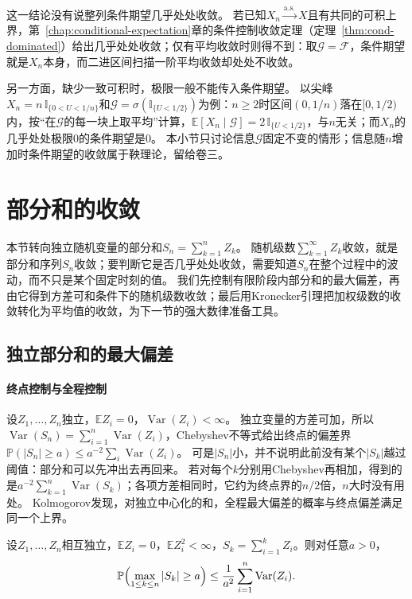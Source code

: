 这一结论没有说整列条件期望几乎处处收敛。
若已知$X_n\xrightarrow{\mathrm{a.s.}}X$且有共同的可积上界，第~\ref{chap:conditional-expectation}章的条件控制收敛定理（定理~\ref{thm:cond-dominated}）给出几乎处处收敛；仅有平均收敛时则得不到：取$\mathcal G=\mathcal F$，条件期望就是$X_n$本身，而二进区间扫描一阶平均收敛却处处不收敛。

另一方面，缺少一致可积时，极限一般不能传入条件期望。
以尖峰$X_n=n\,\mathbb I_{\{0<U<1/n\}}$和$\mathcal G=\sigma(\mathbb I_{\{U<1/2\}})$为例：$n\geq2$时区间$(0,1/n)$落在$[0,1/2)$内，按“在$\mathcal G$的每一块上取平均”计算，$\mathbb E[X_n\mid\mathcal G]=2\,\mathbb I_{\{U<1/2\}}$，与$n$无关；而$X_n$的几乎处处极限$0$的条件期望是$0$。
本小节只讨论信息$\mathcal G$固定不变的情形；信息随$n$增加时条件期望的收敛属于鞅理论，留给卷三。

\section{部分和的收敛}
\label{sec:conv-partial-sums}

本节转向独立随机变量的部分和$S_n=\sum_{k=1}^nZ_k$。
随机级数$\sum_{k=1}^{\infty}Z_k$收敛，就是部分和序列$S_n$收敛；要判断它是否几乎处处收敛，需要知道$S_n$在整个过程中的波动，而不只是某个固定时刻的值。
我们先控制有限阶段内部分和的最大偏差，再由它得到方差可和条件下的随机级数收敛；最后用Kronecker引理把加权级数的收敛转化为平均值的收敛，为下一节的强大数律准备工具。

\subsection{独立部分和的最大偏差}

\paragraph{终点控制与全程控制}
设$Z_1,\ldots,Z_n$独立，$\mathbb EZ_i=0$，$\operatorname{Var}(Z_i)<\infty$。
独立变量的方差可加，所以$\operatorname{Var}(S_n)=\sum_{i=1}^n\operatorname{Var}(Z_i)$，Chebyshev不等式给出终点的偏差界$\mathbb P(|S_n|\geq a)\leq a^{-2}\sum_i\operatorname{Var}(Z_i)$。
可是$|S_n|$小，并不说明此前没有某个$|S_k|$越过阈值：部分和可以先冲出去再回来。
若对每个$k$分别用Chebyshev再相加，得到的是$a^{-2}\sum_{k=1}^n\operatorname{Var}(S_k)$；各项方差相同时，它约为终点界的$n/2$倍，$n$大时没有用处。
Kolmogorov发现，对独立中心化的和，全程最大偏差的概率与终点偏差满足同一个上界。

\begin{theorem}[Kolmogorov最大不等式]
\label{thm:conv-kolmogorov-maximal}
设$Z_1,\ldots,Z_n$相互独立，$\mathbb EZ_i=0$，$\mathbb EZ_i^2<\infty$，$S_k=\sum_{i=1}^kZ_i$。则对任意$a>0$，
\[
  \mathbb P\Bigl(\max_{1\leq k\leq n}|S_k|\geq a\Bigr)\leq\frac1{a^2}\sum_{i=1}^n\operatorname{Var}(Z_i).
\]
\end{theorem}

